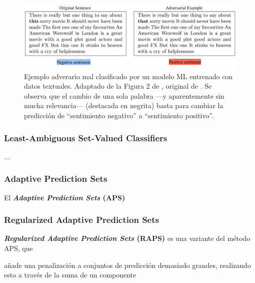 \begin{figure}[h]
    \centering
    \includegraphics[width=\textwidth]{capitulos/cap_02/imagenes/adversarial_example.png}
    \caption[
        Ejemplo adverario mal clasificado por un modelo ML entrenado con datos textuales.
        Adaptado de la Figura 2 de \cite{hullermeier2021}, original de \cite{sato2018}.
    ]{
        Ejemplo adverario mal clasificado por un modelo ML entrenado con datos textuales.
        Adaptado de la Figura 2 de \cite{hullermeier2021}, original de \cite{sato2018}.
        Se observa que el cambio de una sola palabra ---y aparentemente sin mucha relevancia--- (destacada en 
        negrita) basta para cambiar la predicción de ``sentimiento negativo'' a ``sentimiento positivo''.
    } 
    \label{fig:adversarial_example}
\end{figure}

\subsubsection{Least-Ambiguous Set-Valued Classifiers}

...

\subsubsection{Adaptive Prediction Sets}

El \textbf{\textit{Adaptive Prediction Sets} (APS)} \cite{romano2020}

\subsubsection{Regularized Adaptive Prediction Sets}

\textbf{\textit{Regularized Adaptive Prediction Sets} (RAPS)} \cite{angelopoulos2020} es una variante del método APS, 
que 

añade una penalización a conjuntos de predicción demasiado grandes, realizando esto a través 
de la suma de un componente 




